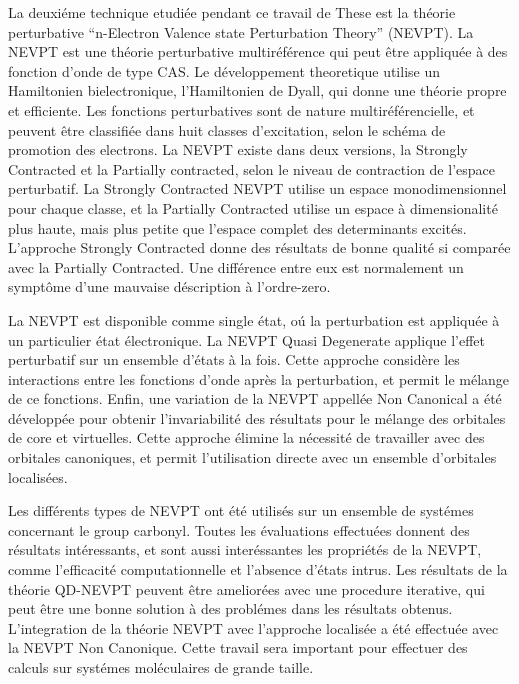 La deuxi\'eme technique etudi\'ee pendant ce travail de These est la th\'eorie
perturbative ``n-Electron Valence state Perturbation Theory'' (NEVPT). La NEVPT
est une th\'eorie perturbative multir\'ef\'erence qui peut \^etre
appliqu\'ee
\`a des fonction d'onde de type CAS. Le d\'eveloppement theoretique utilise
un Hamiltonien bielectronique, l'Hamiltonien de Dyall, qui donne une
th\'eorie propre et efficiente. Les fonctions perturbatives sont de nature
multir\'ef\'erencielle, et peuvent \^etre classifi\'ee dans huit classes d'excitation,
selon le sch\'ema de promotion des electrons. La NEVPT existe dans
deux versions, la Strongly Contracted et la Partially
contracted, selon le niveau de contraction de l'espace perturbatif. La
Strongly Contracted NEVPT utilise un espace monodimensionnel pour chaque
classe, et la Partially Contracted utilise un espace \`a dimensionalit\'e plus
haute, mais plus petite que l'espace complet des determinants excit\'es.
L'approche Strongly Contracted donne des r\'esultats de bonne qualit\'e si
compar\'ee avec la Partially Contracted. Une diff\'erence entre eux est
normalement un sympt\^ome d'une mauvaise d\'escription \`a l'ordre-zero.

La NEVPT est disponible comme single \'etat, o\'u la perturbation est
appliqu\'ee \`a un particulier \'etat \'electronique. La NEVPT Quasi Degenerate
applique l'effet perturbatif sur un ensemble d'\'etats \`a la fois. Cette
approche consid\`ere les interactions entre les fonctions d'onde apr\`es la
perturbation, et permit le m\'elange de ce fonctions.
Enfin, une variation de la NEVPT appell\'ee Non Canonical a \'et\'e
d\'evelopp\'ee pour obtenir l'invariabilit\'e des r\'esultats pour le
m\'elange des orbitales de core et virtuelles. Cette approche \'elimine la
n\'ecessit\'e de travailler avec des orbitales canoniques, et permit
l'utilisation directe avec un ensemble d'orbitales localis\'ees.

Les diff\'erents types de NEVPT ont \'et\'e utilis\'es sur un ensemble de
syst\'emes concernant le group carbonyl. Toutes les \'evaluations effectu\'ees
donnent des r\'esultats int\'eressants, et sont aussi inter\'essantes les
propri\'et\'es de la NEVPT, comme l'efficacit\'e computationnelle et l'absence
d'\'etats intrus.
Les r\'esultats de la th\'eorie QD-NEVPT peuvent \^etre amelior\'ees avec une
procedure iterative, qui peut \^etre une bonne solution \`a des
probl\'emes dans les r\'esultats obtenus.
L'integration de la th\'eorie NEVPT avec l'approche localis\'ee a \'et\'e
effectu\'ee avec la NEVPT Non Canonique. Cette travail sera important pour
effectuer des calculs sur syst\'emes mol\'eculaires de grande taille.

